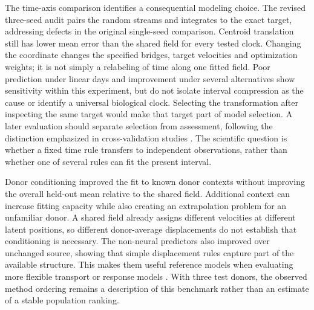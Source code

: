\documentclass[10pt,a4paper]{article}
\begin{document}
The time-axis comparison identifies a consequential modeling choice. The revised three-seed audit pairs the random streams and integrates to the exact target, addressing defects in the original single-seed comparison. Centroid translation still has lower mean error than the shared field for every tested clock. Changing the coordinate changes the specified bridges, target velocities and optimization weights; it is not simply a relabeling of time along one fitted field. Poor prediction under linear days and improvement under several alternatives show sensitivity within this experiment, but do not isolate interval compression as the cause or identify a universal biological clock. Selecting the transformation after inspecting the same target would make that target part of model selection. A later evaluation should separate selection from assessment, following the distinction emphasized in cross-validation studies \citep{varma2006,cawley2010}. The scientific question is whether a fixed time rule transfers to independent observations, rather than whether one of several rules can fit the present interval.

Donor conditioning improved the fit to known donor contexts without improving the overall held-out mean relative to the shared field. Additional context can increase fitting capacity while also creating an extrapolation problem for an unfamiliar donor. A shared field already assigns different velocities at different latent positions, so different donor-average displacements do not establish that conditioning is necessary. The non-neural predictors also improved over unchanged source, showing that simple displacement rules capture part of the available structure. This makes them useful reference models when evaluating more flexible transport or response models \citep{bunne2023}. With three test donors, the observed method ordering remains a description of this benchmark rather than an estimate of a stable population ranking.
\end{document}
